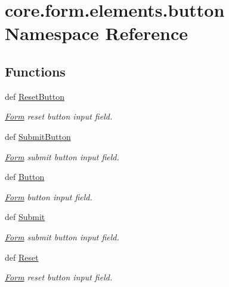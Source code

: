 \hypertarget{namespacecore_1_1form_1_1elements_1_1button}{\section{core.\-form.\-elements.\-button Namespace Reference}
\label{namespacecore_1_1form_1_1elements_1_1button}
}
\subsection*{Functions}
\begin{DoxyCompactItemize}
\item 
def \hyperlink{namespacecore_1_1form_1_1elements_1_1button_a432e381188c62214063d5ec1fef59681}{Reset\-Button}
\begin{DoxyCompactList}\small\item\em \hyperlink{classcore_1_1form_1_1Form}{Form} reset button input field. \end{DoxyCompactList}\item 
def \hyperlink{namespacecore_1_1form_1_1elements_1_1button_ab25329d6af1fcc3ceb5a0d2380a9d06b}{Submit\-Button}
\begin{DoxyCompactList}\small\item\em \hyperlink{classcore_1_1form_1_1Form}{Form} submit button input field. \end{DoxyCompactList}\item 
def \hyperlink{namespacecore_1_1form_1_1elements_1_1button_a428333e0d31a951c73b50020a3e47037}{Button}
\begin{DoxyCompactList}\small\item\em \hyperlink{classcore_1_1form_1_1Form}{Form} button input field. \end{DoxyCompactList}\item 
def \hyperlink{namespacecore_1_1form_1_1elements_1_1button_a3510e6179d282f7a7671ea33ea301e65}{Submit}
\begin{DoxyCompactList}\small\item\em \hyperlink{classcore_1_1form_1_1Form}{Form} submit button input field. \end{DoxyCompactList}\item 
def \hyperlink{namespacecore_1_1form_1_1elements_1_1button_a60e188f1fd0a29da29cc89a12c665c0c}{Reset}
\begin{DoxyCompactList}\small\item\em \hyperlink{classcore_1_1form_1_1Form}{Form} reset button input field. \end{DoxyCompactList}\end{DoxyCompactItemize}


